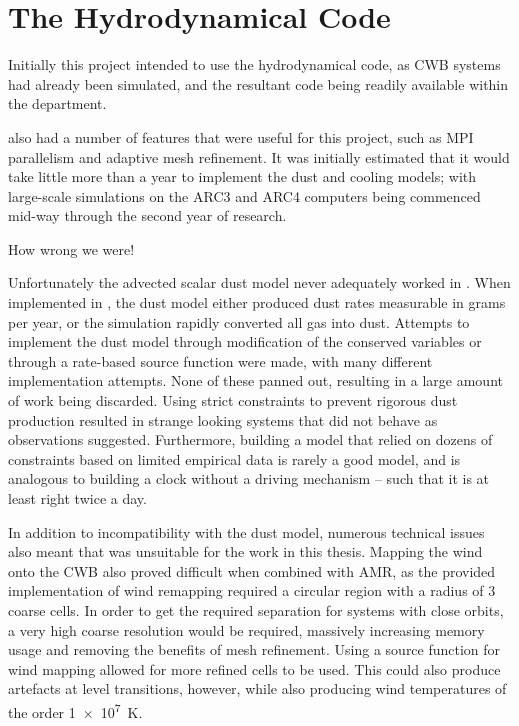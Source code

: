 \section{The \mg{} Hydrodynamical Code}
\label{sec:mgcode}


Initially this project intended to use the \mg{} hydrodynamical code, as CWB systems had already been simulated, and the resultant code being readily available within the department.

\mg{} also had a number of features that were useful for this project, such as MPI parallelism and adaptive mesh refinement.
It was initially estimated that it would take little more than a year to implement the dust and cooling models; with large-scale simulations on the ARC3 and ARC4 computers being commenced mid-way through the second year of research.

How wrong we were!


Unfortunately the advected scalar dust model never adequately worked in \mg.
When implemented in \mg, the dust model either produced dust rates measurable in grams per year, or the simulation rapidly converted all gas into dust.
Attempts to implement the dust model through modification of the conserved variables or through a rate-based source function were made, with many different implementation attempts.
None of these panned out, resulting in a large amount of work being discarded.
Using strict constraints to prevent rigorous dust production resulted in strange looking systems that did not behave as observations suggested.
Furthermore, building a model that relied on dozens of constraints based on limited empirical data is rarely a good model, and is analogous to building a clock without a driving mechanism -- such that it is at least right twice a day.

In addition to incompatibility with the dust model, numerous technical issues also meant that \mg{} was unsuitable for the work in this thesis.
Mapping the wind onto the CWB also proved difficult when combined with AMR, as the provided implementation of wind remapping required a circular region with a radius of 3 coarse cells.
In order to get the required separation for systems with close orbits, a very high coarse resolution would be required, massively increasing memory usage and removing the benefits of mesh refinement.
Using a source function for wind mapping allowed for more refined cells to be used.
This could also produce artefacts at level transitions, however, while also producing wind temperatures of the order \SI{1e7}{K}.

